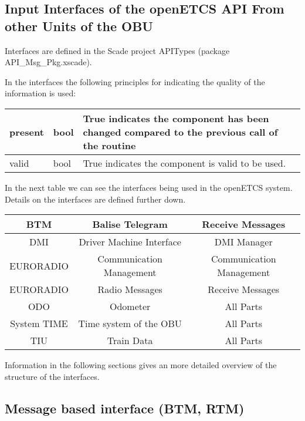 \subsection{Input Interfaces of the openETCS API From other Units of the OBU}
Interfaces are defined in the Scade project APITypes (package API\_Msg\_Pkg.xscade).

In the interfaces the following principles for indicating the quality of the information is used:


\begin{supertabular}{| p{2 cm} | p{2 cm} | p{8 cm} |}
present & bool & True indicates the component has been changed compared to the previous call of the routine
\\\hline 
valid & bool & True indicates the component is valid to be used. 
\\\hline 
\end{supertabular}

In the next table we can see the interfaces being used in the openETCS system. Details on the interfaces are defined further down.

\begin{supertabular}{| c | c | c |}
{BTM} & Balise Telegram & Receive Messages  \\\hline
{DMI} & Driver Machine Interface & DMI Manager  \\\hline
EURORADIO & Communication Management & Communication Management  \\\hline
EURORADIO & Radio Messages & Receive Messages  \\\hline
{ODO} & Odometer & All Parts \\\hline
System TIME & Time system of the OBU & All Parts \\\hline
TIU & Train Data & All Parts \\\hline
\end{supertabular}

Information in the following sections gives an more detailed overview of the structure of the interfaces.


\subsection{Message based interface (BTM, RTM)}


